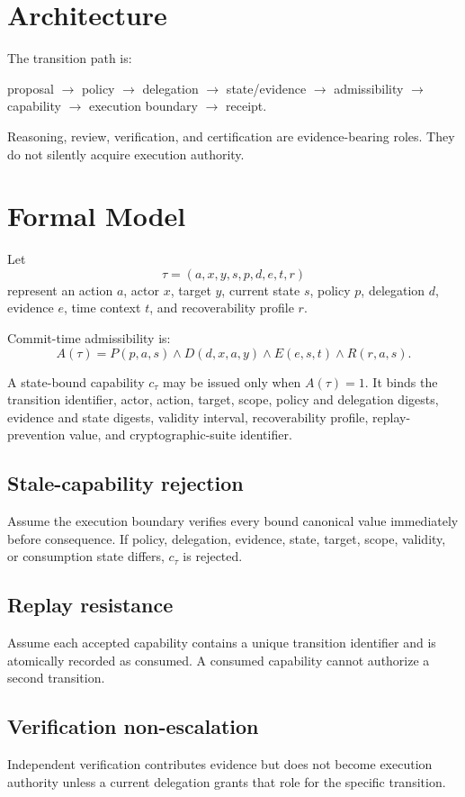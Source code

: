 \documentclass[11pt]{article}
\begin{document}
\section{Architecture}
The transition path is:

\begin{center}
proposal $\rightarrow$ policy $\rightarrow$ delegation $\rightarrow$ state/evidence $\rightarrow$ admissibility $\rightarrow$ capability $\rightarrow$ execution boundary $\rightarrow$ receipt.
\end{center}

Reasoning, review, verification, and certification are evidence-bearing roles. They do not silently acquire execution authority.

\section{Formal Model}
Let
\[
\tau=(a,x,y,s,p,d,e,t,r)
\]
represent an action $a$, actor $x$, target $y$, current state $s$, policy $p$, delegation $d$, evidence $e$, time context $t$, and recoverability profile $r$.

Commit-time admissibility is:
\[
A(\tau)=P(p,a,s)\land D(d,x,a,y)\land E(e,s,t)\land R(r,a,s).
\]

A state-bound capability $c_{\tau}$ may be issued only when $A(\tau)=1$. It binds the transition identifier, actor, action, target, scope, policy and delegation digests, evidence and state digests, validity interval, recoverability profile, replay-prevention value, and cryptographic-suite identifier.

\subsection{Stale-capability rejection}
Assume the execution boundary verifies every bound canonical value immediately before consequence. If policy, delegation, evidence, state, target, scope, validity, or consumption state differs, $c_{\tau}$ is rejected.

\subsection{Replay resistance}
Assume each accepted capability contains a unique transition identifier and is atomically recorded as consumed. A consumed capability cannot authorize a second transition.

\subsection{Verification non-escalation}
Independent verification contributes evidence but does not become execution authority unless a current delegation grants that role for the specific transition.
\end{document}
